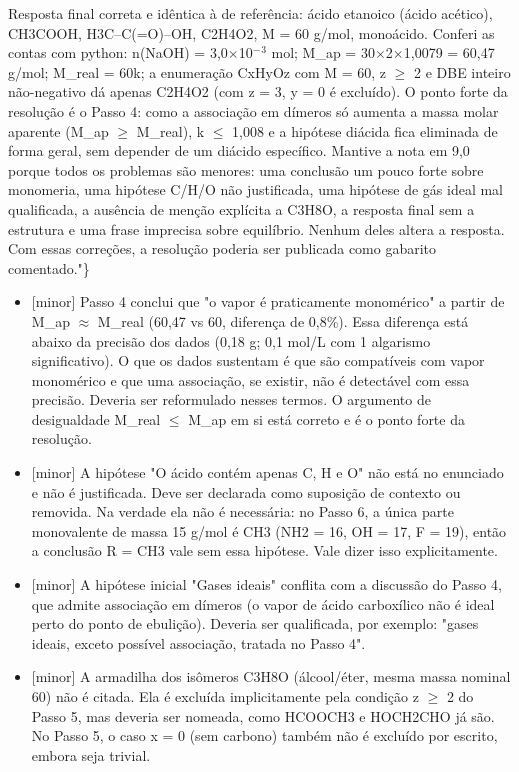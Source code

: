 \documentclass{article}%
\begin{document}
Resposta final correta e idêntica à de referência: ácido etanoico (ácido acético), CH3COOH, H3C--C(=O)--OH, C2H4O2, M = 60 g/mol, monoácido. Conferi as contas com python: n(NaOH) = 3,0$\times$10$^{-}$$^3$ mol; M\_ap = 30$\times$2$\times$1,0079 = 60,47 g/mol; M\_real = 60k; a enumeração CxHyOz com M = 60, z $\geq$ 2 e DBE inteiro não{-}negativo dá apenas C2H4O2 (com z = 3, y = 0 é excluído). O ponto forte da resolução é o Passo 4: como a associação em dímeros só aumenta a massa molar aparente (M\_ap $\geq$ M\_real), k $\leq$ 1,008 e a hipótese diácida fica eliminada de forma geral, sem depender de um diácido específico. Mantive a nota em 9,0 porque todos os problemas são menores: uma conclusão um pouco forte sobre monomeria, uma hipótese C/H/O não justificada, uma hipótese de gás ideal mal qualificada, a ausência de menção explícita a C3H8O, a resposta final sem a estrutura e uma frase imprecisa sobre equilíbrio. Nenhum deles altera a resposta. Com essas correções, a resolução poderia ser publicada como gabarito comentado."\}%
\begin{itemize}%
\item%
{[}minor{]} Passo 4 conclui que "o vapor é praticamente monomérico" a partir de M\_ap $\approx$ M\_real (60,47 vs 60, diferença de 0,8\%). Essa diferença está abaixo da precisão dos dados (0,18 g; 0,1 mol/L com 1 algarismo significativo). O que os dados sustentam é que são compatíveis com vapor monomérico e que uma associação, se existir, não é detectável com essa precisão. Deveria ser reformulado nesses termos. O argumento de desigualdade M\_real $\leq$ M\_ap em si está correto e é o ponto forte da resolução.%
\item%
{[}minor{]} A hipótese "O ácido contém apenas C, H e O" não está no enunciado e não é justificada. Deve ser declarada como suposição de contexto ou removida. Na verdade ela não é necessária: no Passo 6, a única parte monovalente de massa 15 g/mol é CH3 (NH2 = 16, OH = 17, F = 19), então a conclusão R = CH3 vale sem essa hipótese. Vale dizer isso explicitamente.%
\item%
{[}minor{]} A hipótese inicial "Gases ideais" conflita com a discussão do Passo 4, que admite associação em dímeros (o vapor de ácido carboxílico não é ideal perto do ponto de ebulição). Deveria ser qualificada, por exemplo: "gases ideais, exceto possível associação, tratada no Passo 4".%
\item%
{[}minor{]} A armadilha dos isômeros C3H8O (álcool/éter, mesma massa nominal 60) não é citada. Ela é excluída implicitamente pela condição z $\geq$ 2 do Passo 5, mas deveria ser nomeada, como HCOOCH3 e HOCH2CHO já são. No Passo 5, o caso x = 0 (sem carbono) também não é excluído por escrito, embora seja trivial.%

\end{itemize}$$
\end{document}
